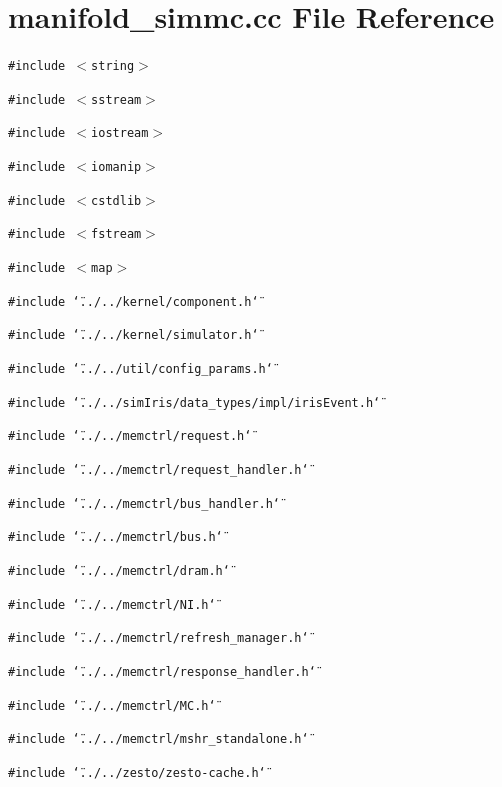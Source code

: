 \section{manifold\_\-simmc.cc File Reference}
\label{manifold__simmc_8cc}
{\tt \#include $<$string$>$}\par
{\tt \#include $<$sstream$>$}\par
{\tt \#include $<$iostream$>$}\par
{\tt \#include $<$iomanip$>$}\par
{\tt \#include $<$cstdlib$>$}\par
{\tt \#include $<$fstream$>$}\par
{\tt \#include $<$map$>$}\par
{\tt \#include \char`\"{}../../kernel/component.h\char`\"{}}\par
{\tt \#include \char`\"{}../../kernel/simulator.h\char`\"{}}\par
{\tt \#include \char`\"{}../../util/config\_\-params.h\char`\"{}}\par
{\tt \#include \char`\"{}../../simIris/data\_\-types/impl/irisEvent.h\char`\"{}}\par
{\tt \#include \char`\"{}../../memctrl/request.h\char`\"{}}\par
{\tt \#include \char`\"{}../../memctrl/request\_\-handler.h\char`\"{}}\par
{\tt \#include \char`\"{}../../memctrl/bus\_\-handler.h\char`\"{}}\par
{\tt \#include \char`\"{}../../memctrl/bus.h\char`\"{}}\par
{\tt \#include \char`\"{}../../memctrl/dram.h\char`\"{}}\par
{\tt \#include \char`\"{}../../memctrl/NI.h\char`\"{}}\par
{\tt \#include \char`\"{}../../memctrl/refresh\_\-manager.h\char`\"{}}\par
{\tt \#include \char`\"{}../../memctrl/response\_\-handler.h\char`\"{}}\par
{\tt \#include \char`\"{}../../memctrl/MC.h\char`\"{}}\par
{\tt \#include \char`\"{}../../memctrl/mshr\_\-standalone.h\char`\"{}}\par
{\tt \#include \char`\"{}../../zesto/zesto-cache.h\char`\"{}}\par


